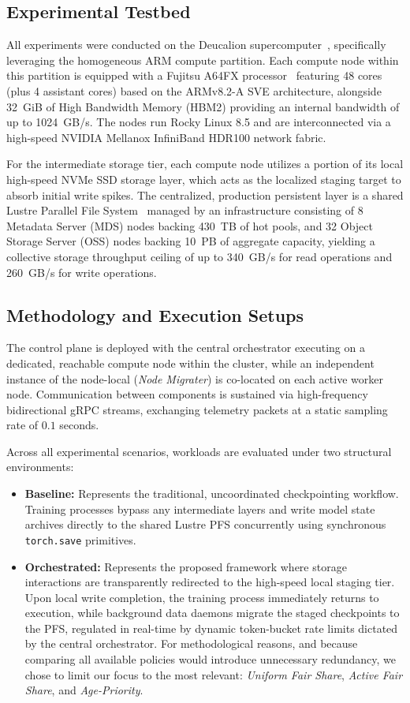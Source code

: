 \documentclass[sigplan,twocolumn,10pt,nonacm]{acmart}
\begin{document}
\subsection{Experimental Testbed}
All experiments were conducted on the Deucalion supercomputer~\cite{deucalion}, specifically leveraging the homogeneous ARM compute partition. Each compute node
within this partition is equipped with a Fujitsu A64FX processor~\cite{A64FXdatasheet} featuring 48 cores (plus 4 assistant cores) based on the ARMv8.2-A SVE architecture, alongside
32~GiB of High Bandwidth Memory (HBM2) providing an internal bandwidth of up to 1024~GB/s. The nodes run Rocky Linux 8.5 and are interconnected via a high-speed
NVIDIA Mellanox InfiniBand HDR100 network fabric.

For the intermediate storage tier, each compute node utilizes a portion of its local high-speed NVMe SSD storage layer, which acts as the localized staging
target to absorb initial write spikes. The centralized, production persistent layer is a shared Lustre Parallel File System~\cite{macc2026deucalion} managed by an infrastructure
consisting of 8 Metadata Server (MDS) nodes backing 430~TB of hot pools, and 32 Object Storage Server (OSS) nodes backing 10~PB of aggregate capacity, yielding a
collective storage throughput ceiling of up to 340~GB/s for read operations and 260~GB/s for write operations.

\subsection{Methodology and Execution Setups}
The control plane is deployed with the central orchestrator executing on a dedicated, reachable compute node within the cluster, while an independent instance of
the node-local (\textit{Node Migrater}) is co-located on each active worker node. Communication between components is sustained via high-frequency bidirectional
gRPC streams, exchanging telemetry packets at a static sampling rate of $0.1$ seconds.

Across all experimental scenarios, workloads are evaluated under two structural environments:
\begin{itemize}
    \item \textbf{Baseline:} Represents the traditional, uncoordinated checkpointing workflow. Training processes bypass any intermediate layers and write model state
    archives directly to the shared Lustre PFS concurrently using synchronous \texttt{torch.save} primitives.
    \item \textbf{Orchestrated:} Represents the proposed framework where storage interactions are transparently redirected to the high-speed local staging tier. Upon
    local write completion, the training process immediately returns to execution, while background data daemons migrate the staged checkpoints to the PFS, regulated
        in real-time by dynamic token-bucket rate limits dictated by the central orchestrator. For methodological reasons, and because comparing all available policies would introduce unnecessary redundancy, we chose to limit our focus to the most relevant: \textit{Uniform Fair Share}, \textit{Active Fair Share}, and \textit{Age-Priority}.
\end{itemize}
\end{document}
